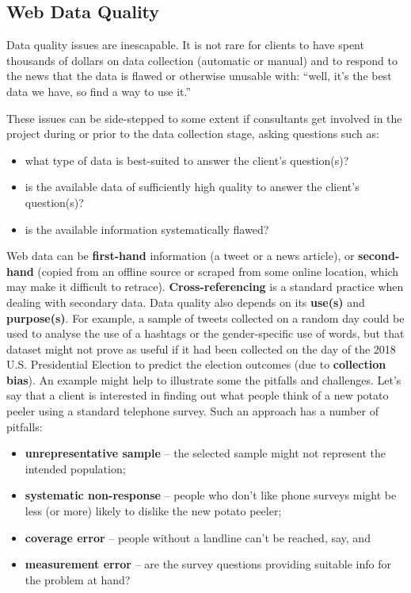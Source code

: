 \subsection{Web Data Quality} Data quality issues are inescapable. It is not rare for clients to have spent thousands of dollars on data collection (automatic or manual) and to respond to the news that the data is flawed or otherwise unusable with: ``well, it's the best data we have, so find a way to use it.''\par These issues can be side-stepped to some extent if consultants get involved in the project during or prior to the data collection stage, asking questions such as:
\begin{itemize}[noitemsep]
    \item what type of data is best-suited to answer the client's question(s)?
    \item is the available data of sufficiently high quality to answer the client's question(s)?
    \item is the available information systematically flawed?
\end{itemize}
Web data can be \textbf{first-hand} information (a tweet or a news article), or \textbf{second-hand} (copied from an offline source or scraped from some online location, which may make it difficult to retrace). \textbf{Cross-referencing} is a standard practice when dealing with secondary data.  \newl Data quality also depends on its \textbf{use(s)} and \textbf{purpose(s)}. For example,
a sample of tweets collected on a random day could be used to analyse the use of a hashtags or the gender-specific use of words, but that dataset might not prove as useful if it had been collected on the day of the 2018 U.S. Presidential Election to predict the election outcomes (due to \textbf{collection bias}).
\newl An example might help to illustrate some the pitfalls and challenges. Let's say that a client is interested in finding out what people think of a new potato peeler using a standard telephone survey. 
Such an approach has a number of pitfalls:
\begin{itemize}[noitemsep]
\item\textbf{unrepresentative sample} -- the selected sample might not represent the intended population;
\item\textbf{systematic non-response} -- people who don't like phone surveys might be less (or more) likely to dislike the new potato peeler;  
\item\textbf{coverage error} -- people without a landline can't be reached, say, and 
\item\textbf{measurement error} -- are the survey questions providing suitable info for the problem at hand?
\end{itemize}
